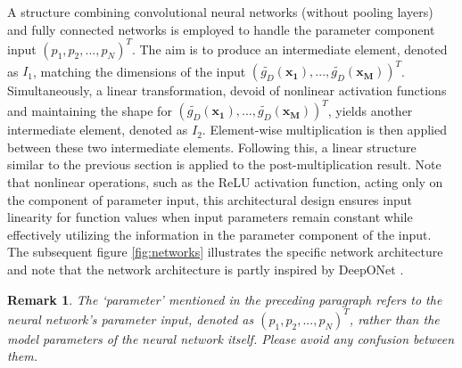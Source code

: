 \documentclass{article}
\newtheorem{remark}{Remark}
\begin{document}
A structure combining convolutional neural networks (without pooling layers) and fully connected networks is employed to handle the parameter component input $(p_1, p_2, ..., p_N)^T$. The aim is to produce an intermediate element, denoted as $I_1$, matching the dimensions of the input $(\widetilde{g_D}(\mathbf{x_1}), ..., \widetilde{g_D}(\mathbf{x_M}))^T$. Simultaneously, a linear transformation, devoid of nonlinear activation functions and maintaining the shape for $(\widetilde{g_D}(\mathbf{x_1}), ..., \widetilde{g_D}(\mathbf{x_M}))^T$, yields another intermediate element, denoted as $I_2$. Element-wise multiplication is then applied between these two intermediate elements. Following this, a linear structure similar to the previous section is applied to the post-multiplication result. Note that nonlinear operations, such as the ReLU activation function, acting only on the component of parameter input, this architectural design ensures input linearity for function values when input parameters remain constant while effectively utilizing the information in the parameter component of the input. The subsequent figure \ref{fig:networks} illustrates the specific network architecture and note that the network architecture is partly inspired by DeepONet \cite{lulu2021deeponet}.
\begin{remark}
The `parameter' mentioned in the preceding paragraph refers to the neural network's parameter input, denoted as $(p_1, p_2, ..., p_N)^T$, rather than the model parameters of the neural network itself. Please avoid any confusion between them.
\end{remark}

    
    
\end{document}
